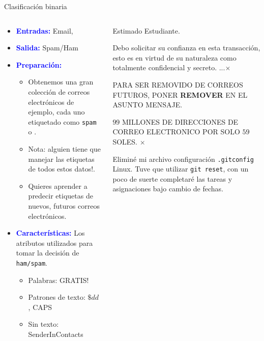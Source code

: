 \documentclass[11pt]{beamer}
\begin{document}
\begin{frame}{Clasificaci\'on binaria}
\begin{columns}
\begin{column}{0.61\textwidth}
		
\begin{itemize}
\item \textcolor{blue}{\textbf{Entradas:}} Email, 
\item \textcolor{blue}{\textbf{Salida:}} Spam/Ham
\item \textcolor{blue}{\textbf{Preparaci\'on:}}

\begin{itemize}
\item  \scriptsize{Obtenemos una gran colecci\'on de correos electr\'onicos de ejemplo, cada uno etiquetado como \texttt{spam} o .}
\item \scriptsize{Nota: alguien tiene que manejar las etiquetas de todos estos datos!.}
\item \scriptsize{Quieres aprender a predecir etiquetas de nuevos, futuros correos electr\'onicos.}
\end{itemize}
\item \textcolor{blue}{\textbf{Caracter\'isticas:}} \scriptsize{Los atributos utilizados para tomar la decisi\'on de \texttt{ham/spam}}.
\begin{itemize}
\item \scriptsize{Palabras: GRATIS!}
\item  \scriptsize{Patrones de texto: $\$dd$ , CAPS}
\item  \scriptsize{Sin texto: SenderInContacts}
\end{itemize}
\end{itemize}
\end{column}
\begin{column}{0.49\textwidth}  
\begin{framed}
\scriptsize{Estimado Estudiante.}

\vspace{0.2cm}

\tiny {Debo solicitar su confianza en esta transacci\'on, esto es en virtud de su naturaleza como totalmente confidencial y secreto. ...\huge$\times$
}
\end{framed}
\begin{framed}
\tiny{PARA SER REMOVIDO DE CORREOS FUTUROS,  PONER \textbf{REMOVER} EN EL ASUNTO MENSAJE.

$99$ MILLONES DE DIRECCIONES DE CORREO ELECTRONICO POR SOLO $ 59$ SOLES. \huge$\times$}
\end{framed}
\begin{framed}
\tiny{ Elimin\'e mi archivo configuraci\'on  \texttt{.gitconfig} Linux. Tuve que utilizar \texttt{git reset}, con un poco de suerte completar\'e las tareas y asignaciones bajo cambio de fechas. \huge \checkmark}
\end{framed}
\end{column}
\end{columns}
\end{frame}
\end{document}
